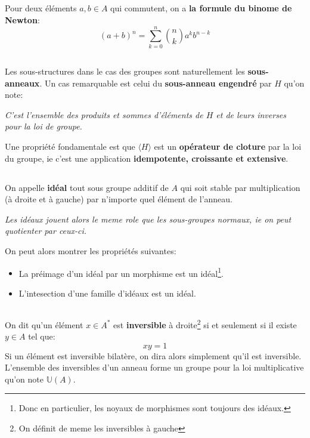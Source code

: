 \subsection*{}
Pour deux éléments \(a, b \in A\) qui commutent, on a \textbf{la formule du binome de Newton}:
\[
   (a + b)^n = \sum_{k=0}^{n}\binom{n}{k} a^k b^{n-k}   
\]

\subsection*{}
Les sous-structures dans le cas des groupes sont naturellement les \textbf{sous-anneaux}. Un cas remarquable est celui du \textbf{sous-anneau engendré} par \(H\) qu'on note:
\begin{center}
   \textit{C'est l'ensemble des produits et sommes d'éléments de \(H\) et de leurs inverses pour la loi de groupe.}
\end{center}
Une propriété fondamentale est que \(\langle H \rangle\) est un \textbf{opérateur de cloture} par la loi du groupe, ie c'est une application \textbf{idempotente, croissante et extensive}.
\subsection*{}
On appelle \textbf{idéal} tout sous groupe additif de \(A\) qui soit stable par multiplication (à droite et à gauche) par n'importe quel élément de l'anneau.
\begin{center}
   \textit{Les idéaux jouent alors le meme role que les sous-groupes normaux, ie on peut quotienter par ceux-ci.}
\end{center}
On peut alors montrer les propriétés suivantes:
\begin{itemize}
   \item La préimage d'un idéal par un morphisme est un idéal\footnote[2]{Donc en particulier, les noyaux de morphismes sont toujours des idéaux.}.
   \item L'intesection d'une famille d'idéaux est un idéal.
\end{itemize}

\subsection*{}
On dit qu'un élément \(x \in A^*\) est \textbf{inversible} à droite\footnote[2]{On définit de meme les inversibles à gauche} si et seulement si il existe \(y \in A\) tel que:
\[
   xy = 1
\]
Si un élément est inversible bilatère, on dira alors simplement qu'il est inversible. L'ensemble des inversibles d'un anneau forme un groupe pour la loi multiplicative qu'on note \(\mathbb{U}(A)\).
